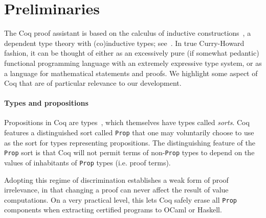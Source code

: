 \documentclass[a4paper,10pt,runningheads]{llncs}
\begin{document}
\section{Preliminaries}
\label{preliminaries}


The Coq proof assistant is based on the calculus of inductive
constructions~\cite{CoquandHuet,CoquandPaulin}, a dependent type theory with (co)inductive types; see~\cite{Coq,BC04}. In true Curry-Howard fashion, it can be thought of either as an excessively pure (if somewhat pedantic) functional programming language with an extremely expressive type system, or as a language for mathematical statements and proofs. We highlight some aspect of Coq that are of particular relevance to our development.

\paragraph{Types and propositions}

Propositions in Coq are types~\cite{ITT,CMCP}, which themselves have types called \emph{sorts}. Coq features a distinguished sort called \lstinline|Prop| that one may voluntarily choose to use as the sort for types representing propositions. The distinguishing feature of the \lstinline|Prop| sort is that Coq will not permit terms of non-\lstinline|Prop| types to depend on the values of inhabitants of \lstinline|Prop| types (i.e. proof terms).


Adopting this regime of discrimination establishes a weak form of proof irrelevance, in that changing a proof can never affect the result of value computations. On a very practical level, this lets Coq safely erase all \lstinline|Prop| components when extracting certified programs to OCaml or Haskell.
\end{document}
